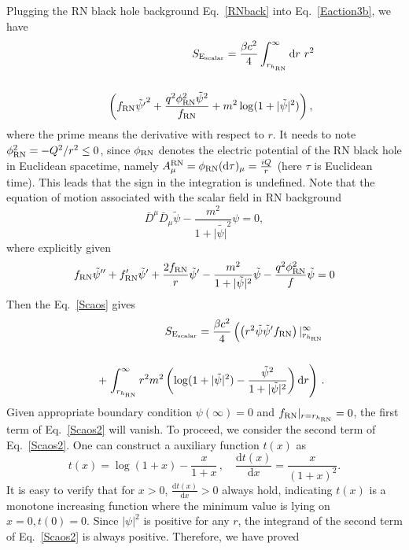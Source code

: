 \documentclass[pr, twocolumn, preprintnumbers, showpacs,footnoteadded, superscriptaddress,nofootinbib,longbibliography]{revtex4-1}
\newcommand{\td}{\mathrm{d}}
\begin{document}
Plugging the RN black hole background Eq.~\eqref{RNback} into Eq.~\eqref{Eaction3b},  we have
%
\begin{eqnarray} \label{Scaos}
&&S_{\text{E}_\text{scalar}}= \frac{\beta c^2}{4}\int^{\infty}_{r_{h_{\rm RN}}} \td r ~r^2 \cr
~\cr
&&\left(f_{\text{RN}} \tilde{\psi'}^2 + \frac{q^2 \phi_{\rm RN}^{2} \tilde{\psi}^2}{f_{\text{RN}}} +m^2 \log(1+|\tilde{\psi}|^2)\right), \,
\end{eqnarray}
%
where the prime means the derivative with respect to $r$. It needs to note $\phi_{\rm RN}^{2}=-Q^2/r^2\leq0$, since $\phi_{\rm RN}$ denotes the electric potential of the RN black hole in Euclidean spacetime, namely $A^{\rm RN}_{\mu}= \phi_{\rm RN}(\td\tau)_{\mu}=\frac{i Q}{r}$ (here $\tau$ is  Euclidean time). This leads that the sign in the integration is undefined. Note that the equation of motion associated with the scalar field in RN background
%
\begin{equation}
\bar{D}^\mu \bar{D}_{\mu}\tilde{\psi} - \frac{m^2}{1+|\tilde{\psi|}^2}\psi=0,
\end{equation}
where explicitly given
%
\begin{equation}
f_{\rm RN}\tilde{\psi}''+f_{\rm RN}'\tilde{\psi}'+\frac{2f_{\rm RN}}{r}\tilde{\psi}'-\frac{m^2}{1+|\tilde{\psi}|^2}\tilde{\psi}- \frac{q^2 \phi_{\rm RN}^2}{f}\tilde{\psi}=0
\end{equation}
%
Then the Eq.~\eqref{Scaos} gives
%
\begin{eqnarray}\label{Scaos2}
&&S_{\text{E}_\text{scalar}}=\frac{\beta c^2}{4}\left( \left(r^2 \tilde{\psi} \tilde{\psi}' f_{\rm RN}\right)|^{\infty}_{r_{h_{\rm RN}}} \right. \cr
~\cr
&&+ \left.\int^{\infty}_{r_{h_{\rm RN}}} r^2
m^2 \left(\log(1+|\tilde{\psi}|^2)-\frac{\tilde{\psi}^2}{1+|\tilde{\psi}|^2}\right)\td r  \right)\, .
\end{eqnarray}
%
Given appropriate boundary condition $\psi (\infty)=0$ and $f_{\rm RN}|_{r=r_{h_{\rm RN}}}=0$, the first term of Eq.~\eqref{Scaos2} will vanish. To proceed, we consider the second term of Eq.~\eqref{Scaos2}. One can construct a auxiliary function $t(x)$ as
%
\begin{equation}
t(x)=\log(1+x)-\frac{x}{1+x}\, , \quad  \frac{\td t(x)}{\td x}=\frac{x}{(1+x)^2} .
\end{equation}
It is easy to verify that for $x>0$, $ \frac{\td t(x)}{\td x}>0$ always hold, indicating $t(x)$ is a monotone increasing function where the minimum value is lying on $x=0, t(0)=0$. Since $|\psi|^2$ is positive for any $r$, the integrand of the second term of Eq.~\eqref{Scaos2} is always positive. Therefore, we have proved
\end{document}
